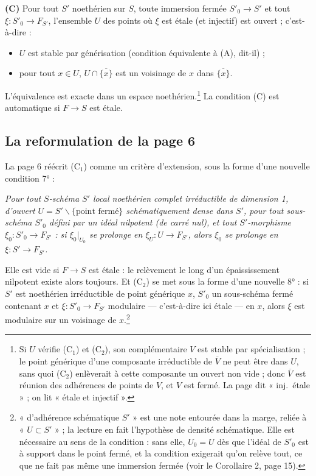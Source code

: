 \documentclass[11pt,a4paper]{article}
\begin{document}
\textbf{(C)} Pour tout $S'$ noethérien sur $S$, toute immersion fermée $S'_0
\to S'$ et tout $\xi : S'_0 \to F_{S'}$, l'ensemble $U$ des points où $\xi$
est étale (et injectif) est ouvert ; c'est-à-dire :
\begin{itemize}
\item[(C$_1$)] $U$ est stable par générisation (condition équivalente à (A),
dit-il) ;
\item[(C$_2$)] pour tout $x \in U$, $U \cap \overline{\{x\}}$ est un
voisinage de $x$ dans $\overline{\{x\}}$.
\end{itemize}
L'équivalence est exacte dans un espace noethérien.\footnote{Si $U$ vérifie
(C$_1$) et (C$_2$), son complémentaire $V$ est stable par spécialisation ;
le point générique d'une composante irréductible de $\overline{V}$ ne peut
être dans $U$, sans quoi (C$_2$) enlèverait à cette composante un ouvert non
vide ; donc $\overline{V}$ est réunion des adhérences de points de $V$, et
$V$ est fermé. La page dit « inj.\ étale » ; on lit « étale et injectif ».}
La condition (C) est automatique si $F \to S$ est étale.

\subsection*{La reformulation de la page 6}

La page 6 réécrit (C$_1$) comme un critère d'extension, sous la forme d'une
nouvelle condition 7° :

\emph{Pour tout $S$-schéma $S'$ local noethérien complet irréductible de
dimension 1, d'ouvert $U = S' \smallsetminus \{\text{point fermé}\}$
schématiquement dense dans $S'$, pour tout sous-schéma $S'_0$ défini par un
idéal nilpotent (de carré nul), et tout $S'$-morphisme $\xi_0 : S'_0 \to
F_{S'}$ : si $\xi_0|_{U_0}$ se prolonge en $\xi_U : U \to F_{S'}$, alors
$\xi_0$ se prolonge en $\xi : S' \to F_{S'}$.}

Elle est vide si $F \to S$ est étale : le relèvement le long d'un
épaississement nilpotent existe alors toujours. Et (C$_2$) se met sous la
forme d'une nouvelle 8° : si $S'$ est noethérien irréductible de point
générique $x$, $S'_0$ un sous-schéma fermé contenant $x$ et $\xi : S'_0 \to
F_{S'}$ modulaire — c'est-à-dire ici étale — en $x$, alors $\xi$ est
modulaire sur un voisinage de $x$.\footnote{« d'adhérence schématique $S'$ »
est une note entourée dans la marge, reliée à « $U \subset S'$ » ; la
lecture en fait l'hypothèse de densité schématique. Elle est nécessaire au
sens de la condition : sans elle, $U_0 = U$ dès que l'idéal de $S'_0$ est à
support dans le point fermé, et la condition exigerait qu'on relève tout, ce
que ne fait pas même une immersion fermée (voir le Corollaire 2, page 15).}
\end{document}
